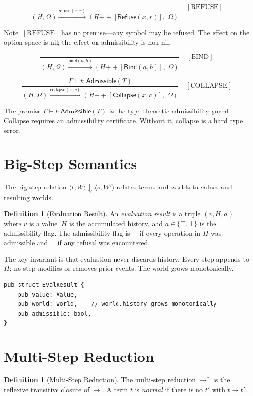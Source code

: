 \documentclass[12pt, a4paper, openany]{book}
\theoremstyle{plain}
\theoremstyle{definition}
\newtheorem{definition}[theorem]{Definition}
\theoremstyle{remark}
\newcommand{\Refuse}{\mathsf{Refuse}}
\newcommand{\Bind}{\mathsf{Bind}}
\newcommand{\Collapse}{\mathsf{Collapse}}
\newcommand{\Adm}{\mathsf{Admissible}}
\begin{document}
\[
\frac{}{(H, \Omega) \xrightarrow{\mathsf{refuse}(x,r)} (H \mathbin{++} [\Refuse(x, r)],\; \Omega)} \quad [\mathrm{REFUSE}]
\]

Note: $[\mathrm{REFUSE}]$ has no premise---any symbol may be refused. The effect
on the option space is nil; the effect on admissibility is non-nil.

\[
\frac{}{(H, \Omega) \xrightarrow{\mathsf{bind}(a,b)} (H \mathbin{++} [\Bind(a, b)],\; \Omega)} \quad [\mathrm{BIND}]
\]

\[
\frac{\Gamma \vdash t : \Adm(T)}{(H, \Omega) \xrightarrow{\mathsf{collapse}(x,c)} (H \mathbin{++} [\Collapse(x, c)],\; \Omega)} \quad [\mathrm{COLLAPSE}]
\]

The premise $\Gamma \vdash t : \Adm(T)$ is the type-theoretic admissibility guard.
Collapse requires an admissibility certificate. Without it, collapse is a hard
type error.

\section{Big-Step Semantics}

The big-step relation $\langle t, W \rangle \Downarrow \langle v, W' \rangle$
relates terms and worlds to values and resulting worlds.

\begin{definition}[Evaluation Result]
An \emph{evaluation result} is a triple $(v, H, a)$ where $v$ is a value,
$H$ is the accumulated history, and $a \in \{\top, \bot\}$ is the admissibility
flag. The admissibility flag is $\top$ if every operation in $H$ was admissible
and $\bot$ if any refusal was encountered.
\end{definition}

The key invariant is that evaluation never discards history. Every step appends
to $H$; no step modifies or removes prior events. The world grows monotonically.

\begin{lstlisting}[style=rust, caption={Evaluation result preserving all history}]
pub struct EvalResult {
    pub value: Value,
    pub world: World,    // world.history grows monotonically
    pub admissible: bool,
}
\end{lstlisting}

\section{Multi-Step Reduction}

\begin{definition}[Multi-Step Reduction]
The multi-step reduction $\to^*$ is the reflexive transitive closure of $\to$.
A term $t$ is \emph{normal} if there is no $t'$ with $t \to t'$.
\end{definition}
\end{document}
